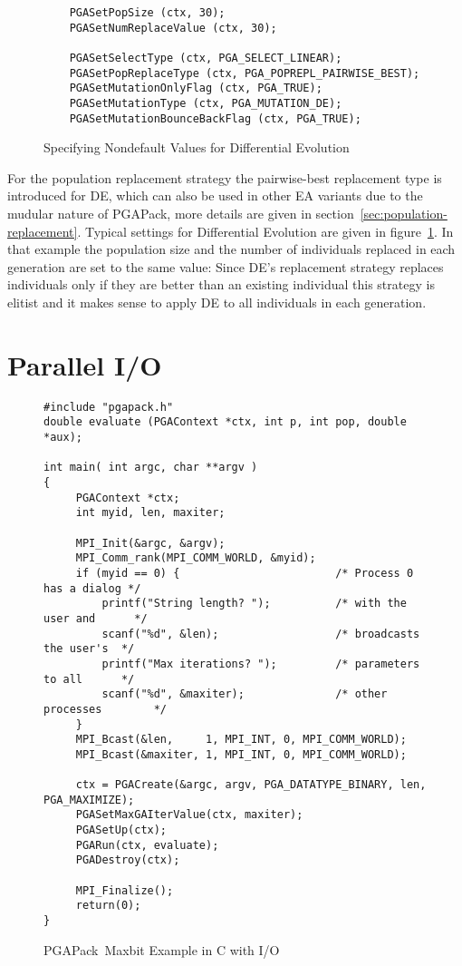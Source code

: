 \documentclass{report}
\newcommand{\pga}{PGAPack}
\begin{document}
\begin{figure}[bt]
\begin{verbatim}
    PGASetPopSize (ctx, 30);
    PGASetNumReplaceValue (ctx, 30);

    PGASetSelectType (ctx, PGA_SELECT_LINEAR);
    PGASetPopReplaceType (ctx, PGA_POPREPL_PAIRWISE_BEST);
    PGASetMutationOnlyFlag (ctx, PGA_TRUE);
    PGASetMutationType (ctx, PGA_MUTATION_DE);
    PGASetMutationBounceBackFlag (ctx, PGA_TRUE);
\end{verbatim}
\caption{Specifying Nondefault Values for Differential Evolution}
\label{example:de-settings}
\end{figure}


For the population replacement strategy the
pairwise-best replacement type is introduced for DE, which can also be
used in other EA variants due to the mudular nature of \pga, more
details are given in section~\ref{sec:population-replacement}. Typical
settings for Differential Evolution are given in
figure~\ref{example:de-settings}. In that example the population size
and the number of individuals replaced in each generation are set to the
same value: Since DE's replacement strategy replaces individuals only if
they are better than an existing individual this strategy is elitist and
it makes sense to apply DE to all individuals in each generation.


\section{Parallel I/O}\label{sec:parallel-simple-example}

\begin{figure}
\begin{verbatim}
#include "pgapack.h"
double evaluate (PGAContext *ctx, int p, int pop, double *aux);

int main( int argc, char **argv )
{
     PGAContext *ctx;
     int myid, len, maxiter;

     MPI_Init(&argc, &argv);
     MPI_Comm_rank(MPI_COMM_WORLD, &myid);
     if (myid == 0) {                        /* Process 0 has a dialog */
         printf("String length? ");          /* with the user and      */
         scanf("%d", &len);                  /* broadcasts the user's  */
         printf("Max iterations? ");         /* parameters to all      */
         scanf("%d", &maxiter);              /* other processes        */
     }
     MPI_Bcast(&len,     1, MPI_INT, 0, MPI_COMM_WORLD);
     MPI_Bcast(&maxiter, 1, MPI_INT, 0, MPI_COMM_WORLD);

     ctx = PGACreate(&argc, argv, PGA_DATATYPE_BINARY, len, PGA_MAXIMIZE);
     PGASetMaxGAIterValue(ctx, maxiter);
     PGASetUp(ctx);
     PGARun(ctx, evaluate);
     PGADestroy(ctx);

     MPI_Finalize();
     return(0);
}
\end{verbatim}
\caption{\pga\ Maxbit Example in C with I/O}
\label{example:parallel-simple-main}
\end{figure}
\end{document}
